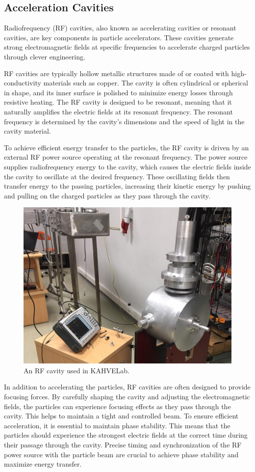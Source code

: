 \documentclass[a4paper,oneside,12pt]{report}
\numberwithin{equation}{chapter}
\begin{document}
\subsection{Acceleration Cavities} \label{sec:theory_cavities}
Radiofrequency (RF) cavities, also known as accelerating cavities or resonant cavities, are key components in particle accelerators. 
These cavities generate strong electromagnetic fields at specific frequencies to accelerate charged particles through clever engineering.

RF cavities are typically hollow metallic structures made of or coated with high-conductivity materials such as copper. 
The cavity is often cylindrical or spherical in shape, and its inner surface is polished to minimize energy losses through resistive heating.
The RF cavity is designed to be resonant, meaning that it naturally amplifies the electric fields at its resonant frequency. 
The resonant frequency is determined by the cavity's dimensions and the speed of light in the cavity material.

To achieve efficient energy transfer to the particles, the RF cavity is driven by an external RF power source operating at the resonant frequency. 
The power source supplies radiofrequency energy to the cavity, which causes the electric fields inside the cavity to oscillate at the desired frequency. 
These oscillating fields then transfer energy to the passing particles, increasing their kinetic energy by pushing and pulling on the charged particles as they pass through the cavity. 
\newline

\begin{figure}[H]
    \centering
    \includegraphics[width=.5\textwidth]{./figures/pill_box.jpeg}
    \vspace{-1pt}
    \caption{An RF cavity used in KAHVELab.}
\end{figure}

\vspace{-15pt}
In addition to accelerating the particles, RF cavities are often designed to provide focusing forces. 
By carefully shaping the cavity and adjusting the electromagnetic fields, the particles can experience focusing effects as they pass through the cavity. 
This helps to maintain a tight and controlled beam. To ensure efficient acceleration, it is essential to maintain phase stability. 
This means that the particles should experience the strongest electric fields at the correct time during their passage through the cavity. 
Precise timing and synchronization of the RF power source with the particle beam are crucial to achieve phase stability and maximize energy transfer.
\end{document}
